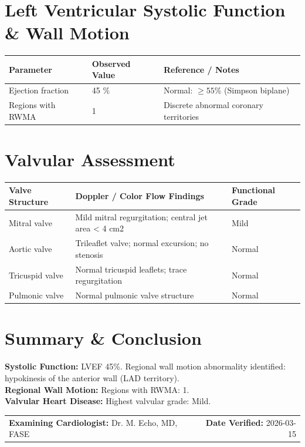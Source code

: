 \documentclass[10pt,a4paper]{article}
\begin{document}
\vspace{10pt}

\section*{Left Ventricular Systolic Function \& Wall Motion}

\begin{tabular}{@{} p{6.8cm} p{2.8cm} p{5.5cm} @{}}
  \toprule
  \textbf{Parameter} & \textbf{Observed Value} & \textbf{Reference / Notes} \\
  \midrule
  Ejection fraction & 45 \% & Normal: $\ge 55$\% (Simpson biplane) \\
  Regions with RWMA & 1 & Discrete abnormal coronary territories \\
  \bottomrule
\end{tabular}

\vspace{10pt}

\section*{Valvular Assessment}

\begin{tabular}{@{} p{3.2cm} p{8.4cm} p{3.2cm} @{}}
  \toprule
  \textbf{Valve Structure} & \textbf{Doppler / Color Flow Findings} & \textbf{Functional Grade} \\
  \midrule
  Mitral valve & Mild mitral regurgitation; central jet area < 4 cm2 & Mild \\
  Aortic valve & Trileaflet valve; normal excursion; no stenosis & Normal \\
  Tricuspid valve & Normal tricuspid leaflets; trace regurgitation & Normal \\
  Pulmonic valve & Normal pulmonic valve structure & Normal \\
  \bottomrule
\end{tabular}

\vspace{10pt}

\section*{Summary \& Conclusion}

\noindent
\textbf{Systolic Function:} LVEF 45\%. Regional wall motion abnormality identified: hypokinesis of the anterior wall (LAD territory).\\
\textbf{Regional Wall Motion:} Regions with RWMA: 1.\\
\textbf{Valvular Heart Disease:} Highest valvular grade: Mild.

\vspace{18pt}

\noindent
\begin{tabular*}{\textwidth}{@{} l @{\extracolsep{\fill}} r @{}}
  \textbf{Examining Cardiologist:} Dr. M. Echo, MD, FASE & \textbf{Date Verified:} 2026-03-15 \\
\end{tabular*}
\end{document}
